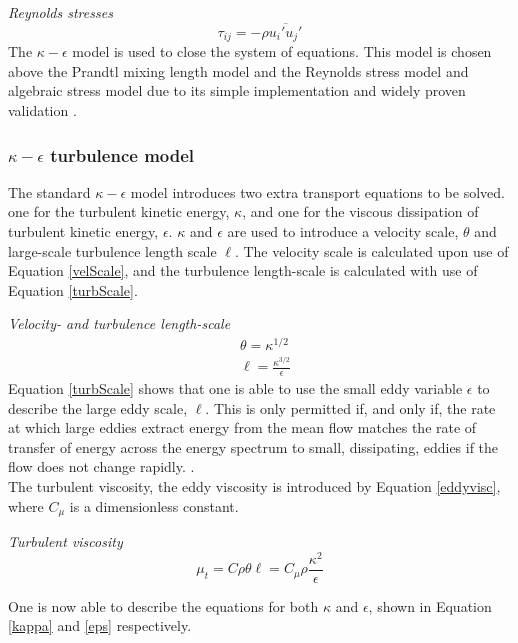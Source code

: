 \documentclass{CFD2017}
\begin{document}
\emph{Reynolds stresses}
\begin{equation}
\label{ReStress}
\tau_{ij}=-\rho\overline{u_i'u_j'}
\end{equation}
The $\kappa-\epsilon$ model is used to close the system of equations. This model is chosen above the Prandtl mixing length model and the Reynolds stress model and algebraic stress model due to its simple implementation and widely proven validation \cite{Versteeg2007}.


\subsubsection{$\kappa-\epsilon$ turbulence model}
The standard  $\kappa-\epsilon$ model introduces two extra transport equations to be solved. one for the turbulent kinetic energy, $\kappa$, and one for the viscous dissipation of turbulent kinetic energy, $\epsilon$.  $\kappa$ and $\epsilon$ are used to introduce a velocity scale, $\theta$ and large-scale turbulence length scale $\ell$. The velocity scale is calculated upon use of Equation \ref{velScale}, and the turbulence length-scale is calculated with use of Equation \ref{turbScale}.\vspace{2mm}

\emph{Velocity- and turbulence length-scale}
\begin{align}
&\theta = \kappa^{1/2} \label{velScale}\\
&\ell=\frac{\kappa^{3/2}}{\epsilon} \label{turbScale}
\end{align}
Equation \ref{turbScale} shows that one is able to use the small eddy variable $\epsilon$ to describe the large eddy scale, $\ell$. This is only permitted if, and only if, the rate at which large eddies extract energy from the mean flow matches the rate of transfer of energy across the energy spectrum to small, dissipating, eddies if the flow does not change rapidly. \cite{Versteeg2007}.\\

The turbulent viscosity, the eddy viscosity is introduced by Equation \ref{eddyvisc}, where $C_{\mu}$ is a dimensionless constant.\vspace{2mm}

\emph{Turbulent viscosity}
\begin{equation}
\label{eddyvisc}
\mu_t=C\rho \theta \ell=C_{\mu}\rho\frac{\kappa^2}{\epsilon}
\end{equation}

One is now able to describe the equations for both $\kappa$ and $\epsilon$, shown in Equation \ref{kappa} and \ref{eps} respectively.\vspace{2mm}
\end{document}
